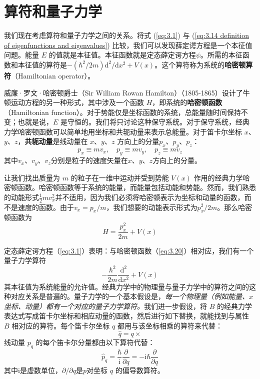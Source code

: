 \section{算符和量子力学}
\label{sec:3.3 Operators and Quantum Mechanics}
	我们现在考虑算符和量子力学之间的关系。将式 (\ref{eq:3.1}) 与 (\ref{eq:3.14 definition of eigenfunctions and eigenvalues}) 比较，我们可以发现薛定谔方程是一个本征值问题。能量 $E$ 的值就是本征值。本征函数就是定态薛定谔方程$\psi$。所需的本征函数和本征值的算符是$-\left(\hbar^2/2m\right)\mathrm{d}^2/\mathrm{d}x^2+V\left(x\right)$。这个算符称为系统的\textbf{哈密顿算符}（Hamiltonian operator）。

	威廉·罗文·哈密顿爵士（Sir William Rowan Hamilton）（1805-1865）设计了牛顿运动方程的另一种形式，其中涉及一个函数 $H$，即系统的\textbf{哈密顿函数}（Hamiltonian function）。对于势能仅是坐标函数的系统，总能量随时间保持不变；也就是说，$E$ 是守恒的。我们将只讨论这种保守系统。对于保守系统，经典力学哈密顿函数可以简单地用坐标和共轭动量来表示总能量。对于笛卡尔坐标 $x$、$y$、$z$，\textbf{共轭动量}是线动量在 $x$、$y$、$z$ 方向上的分量$p_x$、$p_y$、$p_z$：
	\begin{equation}
		\boxed{
			p_x \equiv mv_x, \quad p_y \equiv mv_y, \quad p_z \equiv mv_z
		}
		\label{eq:3.19}
	\end{equation}
	其中$v_x$、$v_y$、$v_z$分别是粒子的速度矢量在$x$、$y$、$z$方向上的分量。

	让我们找出质量为 $m$ 的粒子在一维中运动并受到势能 $V\left(x\right)$ 作用的经典力学哈密顿函数。哈密顿函数等于系统的能量，而能量包括动能和势能。然而，我们熟悉的动能形式$\frac{1}{2}mv_x^2$并不适用，因为我们必须将哈密顿表示为坐标和动量的函数，而不是速度的函数。由于$v_x = p_x/m$，我们想要的动能表示形式为$p_x^2/2m$。那么哈密顿函数为
	\begin{equation}
		H = \frac{p_x^2}{2m}+V\left(x\right)
		\label{eq:3.20}
	\end{equation}

	定态薛定谔方程（\ref{eq:3.1}）表明：与哈密顿函数（\ref{eq:3.20}）相对应，我们有一个量子力学算符
	\begin{equation*}
		-\frac{\hbar^2}{2m}\frac{\mathrm{d}^2}{\mathrm{d}x^2}+V\left(x\right)
	\end{equation*}
	其本征值为系统能量的允许值。经典力学中的物理量与量子力学中的算符之间的这种对应关系是普遍的。量子力学的一个基本假设是，\textit{每一个物理量（例如能量、$x$ 坐标、动量）都有一个对应的量子力学算符。}我们进一步假设，将 $B$ 的经典力学表达式写成笛卡尔坐标和相应动量的函数，然后进行如下替换，就能找到与属性 $B$ 相对应的算符。每个笛卡尔坐标 $q$ 都用与该坐标相乘的算符来代替：
	\begin{equation*}
		\hat{q} = q \times
	\end{equation*}
	线动量 $p_q$ 的每个笛卡尔分量都由以下算符代替：
	\begin{equation*}
		\hat{p}_q = \frac{\hbar}{\mathrm{i}}\frac{\partial}{\partial q} = -\mathrm{i}\hbar\frac{\partial}{\partial q}
	\end{equation*}	
	其中$\mathrm{i}$是虚数单位，$\partial / \partial q$是$p$对坐标 $q$ 的偏导数算符。


